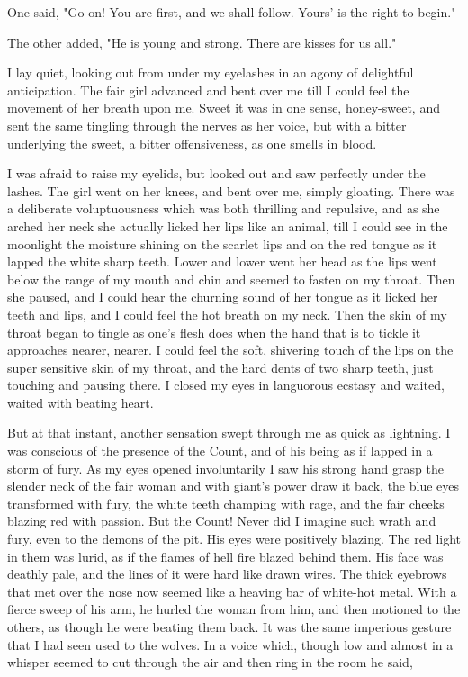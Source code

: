 \documentclass[10pt,a4paper]{article}
\begin{document}
One said, "Go on! You are first, and we shall follow. Yours' is the right to begin."

The other added, "He is young and strong. There are kisses for us all."

I lay quiet, looking out from under my eyelashes in an agony of delightful anticipation. The fair girl advanced and bent over me till I could feel the movement of her breath upon me. Sweet it was in one sense, honey-sweet, and sent the same tingling through the nerves as her voice, but with a bitter underlying the sweet, a bitter offensiveness, as one smells in blood.

I was afraid to raise my eyelids, but looked out and saw perfectly under the lashes. The girl went on her knees, and bent over me, simply gloating. There was a deliberate voluptuousness which was both thrilling and repulsive, and as she arched her neck she actually licked her lips like an animal, till I could see in the moonlight the moisture shining on the scarlet lips and on the red tongue as it lapped the white sharp teeth. Lower and lower went her head as the lips went below the range of my mouth and chin and seemed to fasten on my throat. Then she paused, and I could hear the churning sound of her tongue as it licked her teeth and lips, and I could feel the hot breath on my neck. Then the skin of my throat began to tingle as one's flesh does when the hand that is to tickle it approaches nearer, nearer. I could feel the soft, shivering touch of the lips on the super sensitive skin of my throat, and the hard dents of two sharp teeth, just touching and pausing there. I closed my eyes in languorous ecstasy and waited, waited with beating heart.

But at that instant, another sensation swept through me as quick as lightning. I was conscious of the presence of the Count, and of his being as if lapped in a storm of fury. As my eyes opened involuntarily I saw his strong hand grasp the slender neck of the fair woman and with giant's power draw it back, the blue eyes transformed with fury, the white teeth champing with rage, and the fair cheeks blazing red with passion. But the Count! Never did I imagine such wrath and fury, even to the demons of the pit. His eyes were positively blazing. The red light in them was lurid, as if the flames of hell fire blazed behind them. His face was deathly pale, and the lines of it were hard like drawn wires. The thick eyebrows that met over the nose now seemed like a heaving bar of white-hot metal. With a fierce sweep of his arm, he hurled the woman from him, and then motioned to the others, as though he were beating them back. It was the same imperious gesture that I had seen used to the wolves. In a voice which, though low and almost in a whisper seemed to cut through the air and then ring in the room he said,
\end{document}
